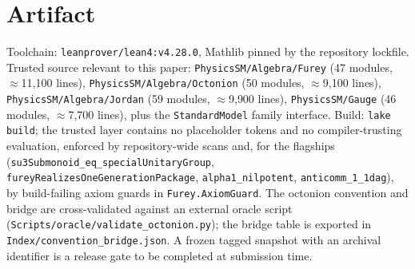 \documentclass[11pt]{article}
\newcommand{\leanname}[1]{\texttt{#1}}
\begin{document}
\appendix
\section{Artifact}
\label{app:artifact}

Toolchain: \leanname{leanprover/lean4:v4.28.0}, Mathlib pinned by the
repository lockfile.  Trusted source relevant to this paper:
\leanname{PhysicsSM/Algebra/Furey} (47 modules, $\approx$11{,}100 lines),
\leanname{PhysicsSM/Algebra/Octonion} (50 modules, $\approx$9{,}100
lines), \leanname{PhysicsSM/Algebra/Jordan} (59 modules,
$\approx$9{,}900 lines), \leanname{PhysicsSM/Gauge} (46 modules,
$\approx$7{,}700 lines), plus the \leanname{StandardModel} family
interface.  Build: \leanname{lake build}; the trusted layer contains no
placeholder tokens and no compiler-trusting evaluation, enforced by
repository-wide scans and, for the flagships
(\leanname{su3Submonoid\_eq\_specialUnitaryGroup},
\leanname{fureyRealizesOneGenerationPackage},
\leanname{alpha1\_nilpotent}, \leanname{anticomm\_1\_1dag}), by
build-failing axiom guards in \leanname{Furey.AxiomGuard}.  The octonion
convention and bridge are cross-validated against an external oracle
script (\leanname{Scripts/oracle/validate\_octonion.py}); the bridge
table is exported in \leanname{Index/convention\_bridge.json}.  A frozen
tagged snapshot with an archival identifier is a release gate to be
completed at submission time.
\end{document}
